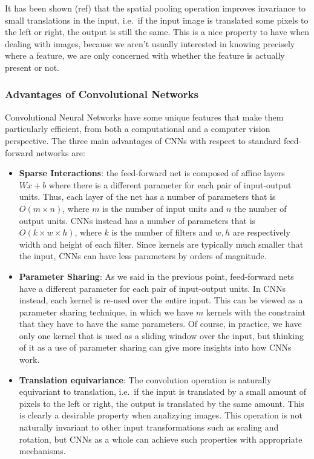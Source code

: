 \documentclass[../main.tex]{subfiles}
\begin{document}
    It has been shown (ref) that the spatial pooling operation improves invariance to small translations in the input, i.e.\ if the
    input image is translated some pixels to the left or right, the output is still the same. This is a nice property to have when
    dealing with images, because we aren't usually interested in knowing precisely where a feature, we are only concerned with whether
    the feature is actually present or not.

    \subsubsection{Advantages of Convolutional Networks}
    Convolutional Neural Networks have some unique features that make them particularly efficient, from both a computational and a
    computer vision perspective. The three main advantages of CNNs with respect to standard feed-forward networks are:
    \begin{itemize}
        \item \textbf{Sparse Interactions}: the feed-forward net is composed of affine layers $Wx + b$ where there is a different
            parameter for each pair of input-output units. Thus, each layer of the net has a number of parameters that is $O(m \times n)$,
            where $m$ is the number of input units and $n$ the number of output units. CNNs instead has a number of parameters that
            is $O(k \times w \times h)$, where $k$ is the number of filters and $w, h$ are respectively width and height of each filter.
            Since kernels are typically much smaller that the input, CNNs can have less parameters by orders of magnitude.

        \item \textbf{Parameter Sharing}: As we said in the previous point, feed-forward nets have a different parameter for each pair
            of input-output units. In CNNs instead, each kernel is re-used over the entire input.
            This can be viewed as a parameter sharing technique, in which we have $m$ kernels with the constraint that they have to
            have the same parameters. Of course, in practice, we have only one kernel that is used as a sliding window over the input,
            but thinking of it as a use of parameter sharing can give more insights into how CNNs work.

        \item \textbf{Translation equivariance}: The convolution operation is naturally equivariant to translation, i.e.\ if the input is
            translated by a small amount of pixels to the left or right, the output is translated by the same amount.  This is clearly a
            desirable property when analizying images. This operation is not naturally invariant to other input transformations such as 
            scaling and rotation, but CNNs as a whole can achieve such properties with appropriate mechanisms.
    \end{itemize}
\end{document}
